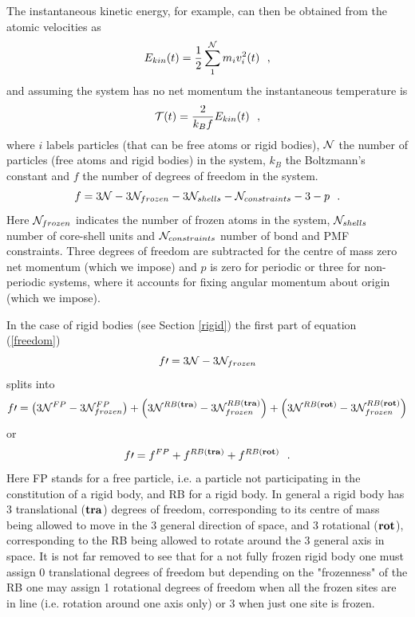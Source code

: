 The instantaneous kinetic energy, for example, can then be
obtained from the atomic velocities as
\begin{equation}
E_{kin}(t) = {1 \over 2} \sum_{1}^{\cal N} m_{i} v_{i}^{2}(t)~~, \label{ekin}
\end{equation}
and assuming the system has no net momentum the instantaneous
temperature is
\begin{equation}
{\cal T}(t) = \frac{2}{k_{B} f} E_{kin}(t)~~, \label{tinst}
\end{equation}
where $i$ labels particles (that can be free atoms or
rigid bodies), ${\cal N}$ the number of particles
(free atoms and rigid bodies) in
the system, $k_{B}$ the Boltzmann's constant and $f$ the number of
degrees of freedom in the system.
\begin{equation}
f = 3{\cal N} - 3{\cal N}_{frozen} - 3{\cal N}_{shells} -
{\cal N}_{constraints} - 3 - p~~. \label{freedom}
\end{equation}
Here ${\cal N}_{frozen}$ indicates the number of frozen atoms in
the system, ${\cal N}_{shells}$ number of core-shell units and
${\cal N}_{constraints}$ number of bond and PMF constraints.
Three degrees of freedom are subtracted for the centre of mass
zero net momentum (which we impose) and $p$ is zero for periodic
or three for non-periodic systems, where it accounts for fixing
angular momentum about origin (which we impose).

In the case of rigid bodies (see Section \ref{rigid})
the first part of equation (\ref{freedom})
\begin{equation}
f\prime = 3{\cal N} - 3{\cal N}_{frozen}
\end{equation}
splits into
\begin{equation}
f\prime = \left( 3{\cal N}^{FP} - 3{\cal N}^{FP}_{frozen} \right) +
          \left( 3{\cal N}^{RB {\bf (tra)}} - 3{\cal N}^{RB {\bf (tra)}}_{frozen} \right) +
          \left( 3{\cal N}^{RB {\bf (rot)}} - 3{\cal N}^{RB {\bf (rot)}}_{frozen} \right)
\end{equation}
or
\begin{equation}
f\prime = f^{FP} + f^{RB {\bf (tra)}} + f^{RB {\bf (rot)}}~~.
\end{equation}
Here FP stands for a free particle, i.e. a particle not
participating in the constitution of a rigid body, and RB for a
rigid body.  In general a rigid body has 3 translational (${\bf tra}$)
degrees of freedom, corresponding to its centre of mass being allowed
to move in the 3 general direction of space, and 3 rotational
(${\bf rot}$), corresponding to the RB being allowed to rotate around
the 3 general axis in space.  It is not far removed to see that for
a not fully frozen rigid body one must assign 0 translational degrees
of freedom but depending on the "frozenness" of the RB one may assign
1 rotational degrees of freedom when all the frozen sites are in line
(i.e. rotation around one axis only) or 3 when just one site is frozen.

